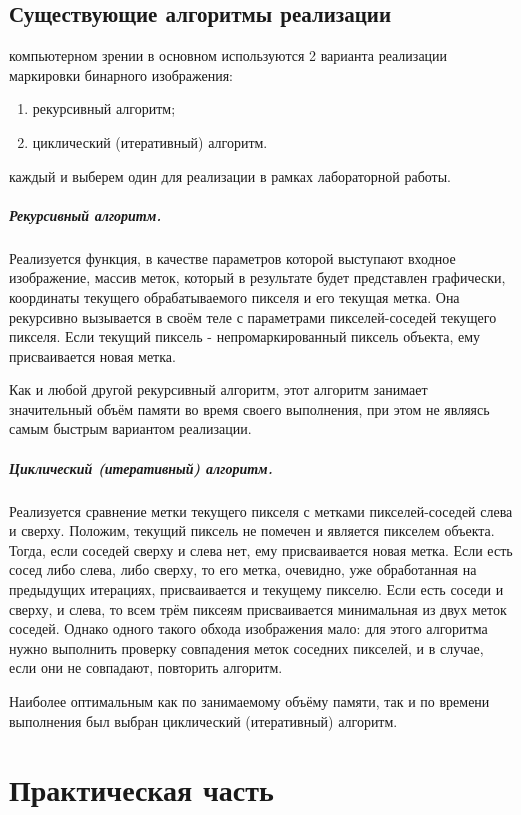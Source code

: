 \documentclass{report}
\begin{document}
\subsection{Существующие алгоритмы реализации}
 компьютерном зрении в основном используются 2 варианта реализации маркировки бинарного изображения:
\begin{enumerate}
    \item рекурсивный алгоритм;
    \item циклический (итеративный) алгоритм.
\end{enumerate}
 каждый и выберем один для реализации в рамках лабораторной работы.
\subparagraph {Рекурсивный алгоритм.}
\par Реализуется функция, в качестве параметров которой выступают входное изображение, массив меток, который в результате будет представлен графически, координаты текущего обрабатываемого пикселя и его текущая метка. Она рекурсивно вызывается в своём теле с параметрами пикселей-соседей текущего пикселя. Если текущий пиксель - непромаркированный пиксель объекта, ему присваивается новая метка.
\par Как и любой другой рекурсивный алгоритм, этот алгоритм занимает значительный объём памяти во время своего выполнения, при этом не являясь самым быстрым вариантом реализации.
\subparagraph {Циклический (итеративный) алгоритм.}
\par Реализуется сравнение метки текущего пикселя с метками пикселей-соседей слева и сверху. Положим, текущий пиксель не помечен и является пикселем объекта. Тогда, если соседей сверху и слева нет, ему присваивается новая метка. Если  есть сосед либо слева, либо сверху, то его метка, очевидно, уже обработанная на предыдущих итерациях, присваивается и текущему пикселю. Если есть соседи и сверху, и слева, то всем трём пиксеям присваивается минимальная из двух меток соседей. Однако одного такого обхода изображения мало: для этого алгоритма нужно выполнить проверку совпадения меток соседних пикселей, и в случае, если они не совпадают, повторить алгоритм.
\par Наиболее оптимальным как по занимаемому объёму памяти, так и по времени выполнения был выбран циклический (итеративный) алгоритм.
\newpage

\section*{Практическая часть}
\end{document}
